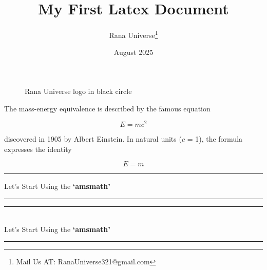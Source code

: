 \documentclass[12pt, letterpaper]{article}
\title{My First Latex Document}
\author{Rana Universe\thanks{Mail Us AT: RanaUniverse321@gmail.com}}
\date{August 2025}
\begin{document}
\maketitle






\begin{figure}[htbp]
\centering


\caption{Rana Universe logo in black circle}

\label{fig:rana-universe-logo}

\end{figure}





\newpage


The mass-energy equivalence is described by the famous equation

\[E=mc^2\]

discovered in 1905 by Albert Einstein. 
In natural units ($c$ = 1), the formula expresses the identity

\begin{equation}
E=m
\end{equation}


\newcommand{\titlevariable}{Let's Start Using the \textbf{`amsmath'}}


\noindent\rule{\linewidth}{5pt}
\begin{center}
\titlevariable \par
\end{center}
\noindent\rule{\linewidth}{5pt}


\begin{center}
\noindent\rule{\linewidth}{5pt} \\
\titlevariable \par
\noindent\rule{\linewidth}{5pt}
\end{center}
\end{document}
